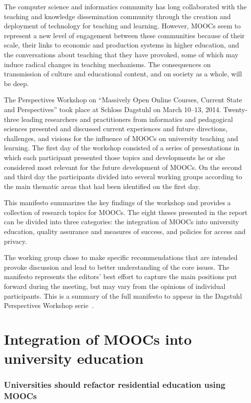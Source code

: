\documentclass[a4paper,UKenglish]{dagman}
\begin{document}
The computer science and informatics community has long collaborated with the teaching and knowledge
dissemination community through the creation and deployment of technology for teaching and learning.
However, MOOCs seem to represent a new level of engagement between these communities because of
their scale, their links to economic and production systems in higher education, and the
conversations about teaching that they have provoked, some of which may induce radical changes in
teaching mechanisms. The consequences on transmission of culture and educational content, and on
society as a whole, will be deep.

The Perspectives Workshop on ``Massively Open Online Courses, Current State and Perspectives'' took
place at Schloss Dagstuhl on March 10--13, 2014.  Twenty-three leading researchers and practitioners
from informatics and pedagogical sciences presented and discussed current experiences and future
directions, challenges, and visions for the influence of MOOCs on university teaching and learning.
The first day of the workshop consisted of a series of presentations in which each participant
presented those topics and developments he or she considered most relevant for the future
development of MOOCs. On the second and third day the participants divided into several working
groups according to the main thematic areas that had been identified on the first day.

This manifesto summarizes the key findings of the workshop and provides a collection of research
topics for MOOCs. The eight theses presented in the report can be divided into three categories: the
integration of MOOCs into university education, quality assurance and measures of success, and
policies for access and privacy.

The working group chose to make specific recommendations that are intended provoke discussion and
lead to better understanding of the core issues. The manifesto represents the editors' best effort
to capture the main positions put forward during the meeting, but may vary from the opinions of
individual participants.  This is a summary of the full manifesto to appear in the Dagstuhl
Perspectives Workshop serie~\cite{DagstuhlManifesto-2014}.


\section{Integration of MOOCs into university education}

\subsubsection*{Universities should refactor residential education using MOOCs}
\end{document}
